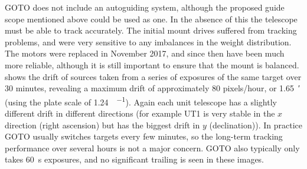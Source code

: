 \begin{colsection}
GOTO does not include an autoguiding system, although the proposed guide scope mentioned above could be used as one. In the absence of this the telescope must be able to track accurately. The initial mount drives suffered from tracking problems, and were very sensitive to any imbalances in the weight distribution. The motors were replaced in November 2017, and since then have been much more reliable, although it is still important to ensure that the mount is balanced.  shows the drift of sources taken from a series of exposures of the same target over 30 minutes, revealing a maximum drift of approximately 80 pixels/hour, or \SI{1.65}{\arcmin} (using the plate scale of \SI[per-mode=symbol]{1.24}{\arcsec\per\pixel}). Again each unit telescope has a slightly different drift in different directions (for example UT1 is very stable in the $x$ direction (right ascension) but has the biggest drift in $y$ (declination)). In practice GOTO usually switches targets every few minutes, so the long-term tracking performance over several hours is not a major concern. GOTO also typically only takes \SI{60}{\second} exposures, and no significant trailing is seen in these images.

\end{colsection}


